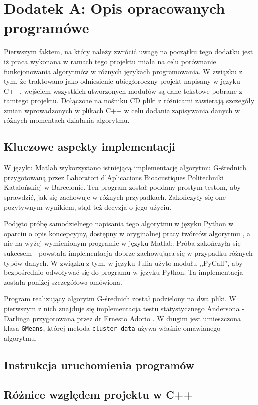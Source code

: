 \section*{Dodatek A: Opis opracowanych programówe}

\qquad Pierwszym faktem, na który należy zwrócić uwagę na początku tego dodatku jest iż praca wykonana w ramach tego projektu miała na celu porównanie funkcjonowania algorytmów w różnych językach programowania. W związku z tym, że traktowano jako odniesienie ubiegłoroczny projekt napisany w języku C++, wejściem wszystkich utworzonych modułów są dane tekstowe pobrane z tamtego projektu. Dołączone na nośniku CD pliki z różnicami zawierają szczegóły zmian wprowadzonych w plikach C++ w celu dodania zapisywania danych w różnych momentach działania algorytmu.

\subsection{Kluczowe aspekty implementacji}

\qquad W języku Matlab wykorzystano istniejącą implementację algorytmu G-średnich przygotowaną przez Laboratori d'Aplicacions Bioacustiques Politechniki Katalońskiej w Barcelonie. Ten program został poddany prostym testom, aby sprawdzić, jak się zachowuje w różnych przypadkach. Zakończyły się one pozytywnym wynikiem, stąd też decyzja o jego użyciu.

Podjęto próbę samodzielnego napisania tego algorytmu w języku Python w oparciu o opis koncepcyjny, dostępny w oryginalnej pracy twórców algorytmu \cite{GMeans}, a nie na wyżej wymienionym programie w języku Matlab. Próba zakończyła się sukcesem - powstała implementacja dobrze zachowująca się w przypadku różnych typów danych. W związku z tym, w języku Julia użyto modułu ,,PyCall'', aby bezpośrednio odwoływać się do programu w języku Python. Ta implementacja została poniżej szczegółowo omówiona.

Program realizujący algorytm G-średnich został podzielony na dwa pliki. W pierwszym z nich znajduje się implementacja testu statystycznego Andersona - Darlinga przygotowana przez dr Ernesto Adorio \cite{ad-test-python}. W drugim jest umieszczona klasa \texttt{GMeans}, której metoda \texttt{cluster\_data} używa właśnie omawianego algorytmu. 

\subsection{Instrukcja uruchomienia programów}

\subsection{Różnice względem projektu w C++}
